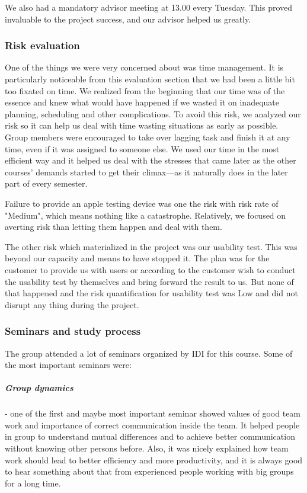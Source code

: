   We also had a mandatory advisor meeting at 13.00 every Tuesday. This proved
  invaluable to the project success, and our advisor helped us greatly.
 	
 \subsubsection{Risk evaluation}
 One of the things we were very concerned about was time management. It is particularly noticeable from this evaluation section that we had been a little bit too fixated on time. We realized from the beginning that our time was of the essence and knew what would have happened if we wasted it on inadequate planning, scheduling and other complications. To avoid this risk, we analyzed our risk so it can help us deal with time wasting situations as early as possible. Group members were encouraged to take over lagging task and finish it at any time, even if it was assigned to someone else. We used our time in the most efficient way and it helped us deal with the stresses that came later as the other courses' demands started to get their climax---as it naturally does in the later part of every semester.

 Failure to provide an apple testing device was one the risk with risk rate of "Medium", which means nothing like a catastrophe. Relatively, we focused on averting risk than letting them happen and deal with them.

 The other risk which materialized in the project was our usability test. This was beyond our capacity and means to have stopped it. The plan was for the customer to provide us with users or according to the customer wish to conduct the usability test by themselves and bring forward the result to us. But none of that happened and the risk quantification for usability test was Low and did not disrupt any thing during the project.
	
	\subsubsection{Seminars and study process}
  The group attended a lot of seminars organized by IDI for this course. Some of
  the most important seminars were:
	
  \subparagraph{Group dynamics} - one of the first and maybe most important
  seminar showed values of good team work and importance of correct
  communication inside the team. It helped people in group to understand mutual
  differences and to achieve better communication without knowing other persons
  before. Also, it was nicely explained how team work should lead to better
  efficiency and more productivity, and it is always good to hear something
  about that from experienced people working with big groups for a long time.

